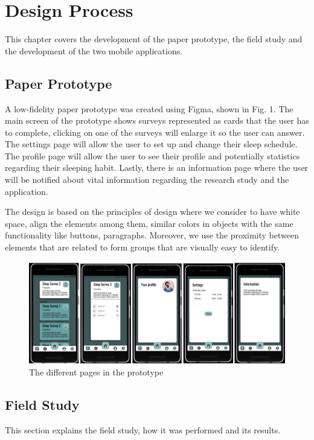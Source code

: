 \documentclass{article}
\begin{document}
\clearpage
\section{Design Process}
This chapter covers the development of the paper prototype, the field study and the development of the two mobile applications.

\subsection{Paper Prototype}
A low-fidelity paper prototype was created using Figma, shown in Fig. 1. The main screen of the prototype shows surveys represented as cards that the user has to complete, clicking on one of the surveys will enlarge it so the user can answer.  The settings page will allow the user to set up and change their sleep schedule. The profile page will allow the user to see their profile and potentially statistics regarding their sleeping habit.  Lastly, there is an information page where the user will be notified about vital information regarding the research study and the application.
 
The design is based on the principles of design where we consider to have white space, align the elements among them, similar colors in objects with the same functionality like buttons, paragraphs.\cite{galitz_essential_2007} Moreover, we use the proximity between elements that are related to form groups that are visually easy to identify.

\begin{figure}[!h]
  \begin{center}
    \includegraphics[scale=0.8]{FigmaPrototype.png}
    \caption{The different pages in the prototype}
    \label{fig:figmaPrototype}
  \end{center}
\end{figure}

\subsection{Field Study}
This section explains the field study, how it was performed and its results. 
\end{document}
